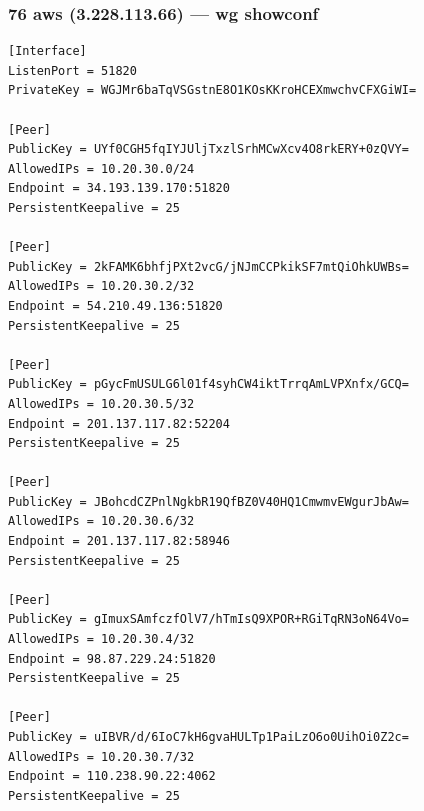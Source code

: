 \documentclass[11pt,a4paper]{article}
\begin{document}
\subsubsection*{76 aws (3.228.113.66) — wg showconf}
\begin{lstlisting}
[Interface]
ListenPort = 51820
PrivateKey = WGJMr6baTqVSGstnE8O1KOsKKroHCEXmwchvCFXGiWI=

[Peer]
PublicKey = UYf0CGH5fqIYJUljTxzlSrhMCwXcv4O8rkERY+0zQVY=
AllowedIPs = 10.20.30.0/24
Endpoint = 34.193.139.170:51820
PersistentKeepalive = 25

[Peer]
PublicKey = 2kFAMK6bhfjPXt2vcG/jNJmCCPkikSF7mtQiOhkUWBs=
AllowedIPs = 10.20.30.2/32
Endpoint = 54.210.49.136:51820
PersistentKeepalive = 25

[Peer]
PublicKey = pGycFmUSULG6l01f4syhCW4iktTrrqAmLVPXnfx/GCQ=
AllowedIPs = 10.20.30.5/32
Endpoint = 201.137.117.82:52204
PersistentKeepalive = 25

[Peer]
PublicKey = JBohcdCZPnlNgkbR19QfBZ0V40HQ1CmwmvEWgurJbAw=
AllowedIPs = 10.20.30.6/32
Endpoint = 201.137.117.82:58946
PersistentKeepalive = 25

[Peer]
PublicKey = gImuxSAmfczfOlV7/hTmIsQ9XPOR+RGiTqRN3oN64Vo=
AllowedIPs = 10.20.30.4/32
Endpoint = 98.87.229.24:51820
PersistentKeepalive = 25

[Peer]
PublicKey = uIBVR/d/6IoC7kH6gvaHULTp1PaiLzO6o0UihOi0Z2c=
AllowedIPs = 10.20.30.7/32
Endpoint = 110.238.90.22:4062
PersistentKeepalive = 25

\end{lstlisting}
\end{document}
